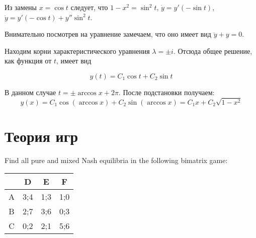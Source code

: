 \begin{solution}
Из замены $x=\cos t$ следует, что $1-x^2=\sin^2 t$, $\dot{y}=y'(-\sin t)$, $\ddot{y}=y'(-\cos t )+y'' \sin^2 t$. 

Внимательно посмотрев на уравнение замечаем, что оно имеет
вид $\ddot{y}+y=0$.

Находим корни характеристического уравнения $\lambda=\pm i$. Отсюда общее решение, как функция от $t$, имеет вид

\[
y(t)=C_1 \cos t + C_2 \sin t
\]

В данном случае $t=\pm \arccos x + 2\pi$. После подстановки получаем:
\[
y(x)=C_1 \cos(\arccos x) + C_2 \sin (\arccos x)= C_1 x + C_2 \sqrt{1-x^2}
\]




\end{solution}


\section{Теория игр}


\begin{problem}
Find all pure and mixed Nash equilibria in the following bimatrix game:


\begin{tabular}{c|ccc}
 & D & E & F \\ 
\hline 
A & 3;4 & 1;3 & 1;0  \\ 
B & 2;7 & 3;6 & 0;3  \\ 
C & 0;2 & 2;1 & 5;6  \\ 
\end{tabular} 
\end{problem}

